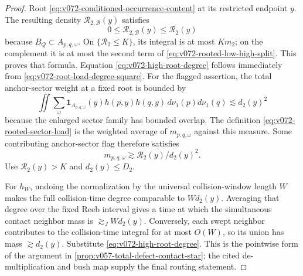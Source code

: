 \documentclass[10pt]{article}
\begin{document}
\begin{proof}
Root \eqref{eq:v072-conditioned-occurrence-content} at its restricted endpoint \(y\).  The resulting
density \(\mathcal R_{2,\mathscr B}(y)\) satisfies
\[
0\le\mathcal R_{2,\mathscr B}(y)\le\mathcal R_2(y)
\]
because \(B_Q\subset A_{p,q,\omega}\).  On
\(\{\mathcal R_2\le K\}\), its integral is at most \(Km_2\); on the complement it is at most the
second term of \eqref{eq:v072-rooted-low-high-split}.  This proves that formula.
Equation \eqref{eq:v072-high-root-degree} follows immediately from
\eqref{eq:v072-root-load-degree-square}.
For the flagged assertion, the total anchor-sector weight at a fixed root is bounded by
\[
\iint
\sum_\omega
\mathbf 1_{A_{p,q,\omega}}(y)h(p,y)h(q,y)
\,d\nu_1(p)d\nu_1(q)
\lesssim d_2(y)^2
\]
because the enlarged sector family has bounded overlap.  The definition
\eqref{eq:v072-rooted-sector-load} is the weighted average of
\(m_{p,q,\omega}\) against this measure.  Some contributing anchor-sector flag therefore satisfies
\[
m_{p,q,\omega}\gtrsim\mathcal R_2(y)/d_2(y)^2.
\]
Use \(\mathcal R_2(y)>K\) and \(d_2(y)\le D_2\).

For \(h_W\), undoing the normalization by the universal collision-window length \(W\) makes the
full collision-time degree comparable to \(Wd_2(y)\).  Averaging that degree over the fixed Reeb
interval gives a time at which the simultaneous contact neighbor mass is
\(\gtrsim_JWd_2(y)\).  Conversely, each swept neighbor contributes to the collision-time integral
for at most \(O(W)\), so its union has mass \(\gtrsim d_2(y)\).  Substitute
\eqref{eq:v072-high-root-degree}.  This is the pointwise form of the argument in
\cref{prop:v057-total-defect-contact-star}; the cited de-multiplication and bush map supply the
final routing statement.
\end{proof}
\end{document}

